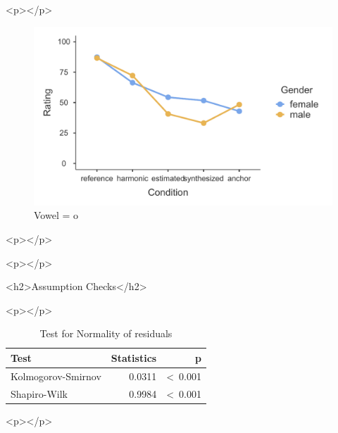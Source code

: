 \documentclass[a4paper,man,hidelinks,floatsintext]{apa7}
\begin{document}
        <p></p>
      
    \begin{figure}[htbp]\caption{Vowel = o}
\label{fig:Figure_3}
\centering
\includegraphics[width=\columnwidth]{figure_3.pdf}
\end{figure}
      
        <p></p>
      
    
      
      
    
      
        <p></p>
      
    <h2>Assumption Checks</h2>
      
        <p></p>
      
    
\begin{table}[!htbp]
\caption{Test for Normality of residuals}
\label{tab:Table_12}
\begin{adjustbox}{max size={\columnwidth}{\textheight}}
\centering
\begin{tabular}{lrr}
\hline
Test               & Statistics &               p \\
\hline
Kolmogorov-Smirnov &     0.0311 & \textless~0.001 \\
Shapiro-Wilk       &     0.9984 & \textless~0.001 \\
\hline
\end{tabular}
\end{adjustbox}
\begin{tablenotes} {
\small
}
\end{tablenotes}
\end{table}
      
        <p></p>
      
\end{document}
